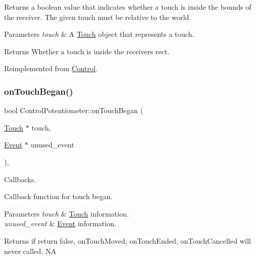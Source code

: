 Returns a boolean value that indicates whether a touch is inside the bounds of the receiver. The given touch must be relative to the world.


\begin{DoxyParams}{Parameters}
{\em touch} & A \hyperlink{classTouch}{Touch} object that represents a touch.\\
\hline
\end{DoxyParams}
\begin{DoxyReturn}{Returns}
Whether a touch is inside the receiver\textquotesingle{}s rect. 
\end{DoxyReturn}


Reimplemented from \hyperlink{classControl_a897865e3e4ff50ed827f33966e786c7f}{Control}.

\mbox{\label{classControlPotentiometer_ae5ab22036e6a15b6a5d388db38f29bc7}} 
\subsubsection{\texorpdfstring{on\+Touch\+Began()}{onTouchBegan()}\hspace{0.1cm}{\footnotesize\ttfamily [1/2]}}
{\footnotesize\ttfamily bool Control\+Potentiometer\+::on\+Touch\+Began (\begin{DoxyParamCaption}\item[{\hyperlink{classTouch}{Touch} $\ast$}]{touch,  }\item[{\hyperlink{classEvent}{Event} $\ast$}]{unused\+\_\+event }\end{DoxyParamCaption})\hspace{0.3cm}{\ttfamily [override]}, {\ttfamily [virtual]}}



Callbacks. 

Callback function for touch began.


\begin{DoxyParams}{Parameters}
{\em touch} & \hyperlink{classTouch}{Touch} information. \\
\hline
{\em unused\+\_\+event} & \hyperlink{classEvent}{Event} information. \\
\hline
\end{DoxyParams}
\begin{DoxyReturn}{Returns}
if return false, on\+Touch\+Moved, on\+Touch\+Ended, on\+Touch\+Cancelled will never called.  NA 
\end{DoxyReturn}


